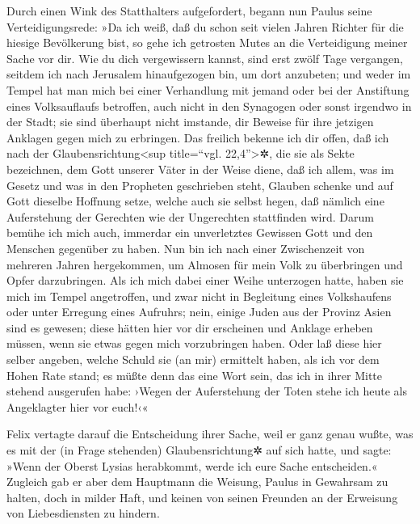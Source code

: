  Durch einen Wink des Statthalters aufgefordert, begann
nun Paulus seine Verteidigungsrede: »Da ich weiß, daß du schon seit
vielen Jahren Richter für die hiesige Bevölkerung bist, so gehe ich
getrosten Mutes an die Verteidigung meiner Sache vor dir.
 Wie du dich vergewissern kannst, sind erst zwölf Tage
vergangen, seitdem ich nach Jerusalem hinaufgezogen bin, um dort
anzubeten;  und weder im Tempel hat man mich bei einer
Verhandlung mit jemand oder bei der Anstiftung eines Volksauflaufs
betroffen, auch nicht in den Synagogen oder sonst irgendwo in der Stadt;
 sie sind überhaupt nicht imstande, dir Beweise für ihre
jetzigen Anklagen gegen mich zu erbringen.  Das freilich
bekenne ich dir offen, daß ich nach der Glaubensrichtung\textless sup
title=``vgl. 22,4''\textgreater✲, die sie als Sekte bezeichnen, dem Gott
unserer Väter in der Weise diene, daß ich allem, was im Gesetz und was
in den Propheten geschrieben steht, Glauben schenke  und
auf Gott dieselbe Hoffnung setze, welche auch sie selbst hegen, daß
nämlich eine Auferstehung der Gerechten wie der Ungerechten stattfinden
wird.  Darum bemühe ich mich auch, immerdar ein
unverletztes Gewissen Gott und den Menschen gegenüber zu haben.
 Nun bin ich nach einer Zwischenzeit von mehreren Jahren
hergekommen, um Almosen für mein Volk zu überbringen und Opfer
darzubringen.  Als ich mich dabei einer Weihe unterzogen
hatte, haben sie mich im Tempel angetroffen, und zwar nicht in
Begleitung eines Volkshaufens oder unter Erregung eines Aufruhrs;
 nein, einige Juden aus der Provinz Asien sind es
gewesen; diese hätten hier vor dir erscheinen und Anklage erheben
müssen, wenn sie etwas gegen mich vorzubringen haben. 
Oder laß diese hier selber angeben, welche Schuld sie (an mir) ermittelt
haben, als ich vor dem Hohen Rate stand;  es müßte denn
das eine Wort sein, das ich in ihrer Mitte stehend ausgerufen habe:
›Wegen der Auferstehung der Toten stehe ich heute als Angeklagter hier
vor euch!‹«

 Felix vertagte darauf die Entscheidung ihrer Sache, weil
er ganz genau wußte, was es mit der (in Frage stehenden)
Glaubensrichtung✲ auf sich hatte, und sagte: »Wenn der Oberst Lysias
herabkommt, werde ich eure Sache entscheiden.«  Zugleich
gab er aber dem Hauptmann die Weisung, Paulus in Gewahrsam zu halten,
doch in milder Haft, und keinen von seinen Freunden an der Erweisung von
Liebesdiensten zu hindern.

